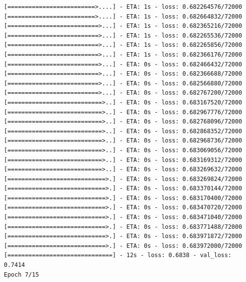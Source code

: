 \documentclass[12pt,fleqn]{article}\usepackage{../../common}
\begin{document}
\begin{verbatim}
[=========================>....] - ETA: 1s - loss: 0.682264576/72000 [=========================>....] - ETA: 1s - loss: 0.682664832/72000 [==========================>...] - ETA: 1s - loss: 0.682365216/72000 [==========================>...] - ETA: 1s - loss: 0.682265536/72000 [==========================>...] - ETA: 1s - loss: 0.682265856/72000 [==========================>...] - ETA: 1s - loss: 0.682366176/72000 [==========================>...] - ETA: 0s - loss: 0.682466432/72000 [==========================>...] - ETA: 0s - loss: 0.682366688/72000 [==========================>...] - ETA: 0s - loss: 0.682566880/72000 [==========================>...] - ETA: 0s - loss: 0.682767200/72000 [===========================>..] - ETA: 0s - loss: 0.683167520/72000 [===========================>..] - ETA: 0s - loss: 0.682967776/72000 [===========================>..] - ETA: 0s - loss: 0.682768096/72000 [===========================>..] - ETA: 0s - loss: 0.682868352/72000 [===========================>..] - ETA: 0s - loss: 0.682968736/72000 [===========================>..] - ETA: 0s - loss: 0.683069056/72000 [===========================>..] - ETA: 0s - loss: 0.683169312/72000 [===========================>..] - ETA: 0s - loss: 0.683269632/72000 [============================>.] - ETA: 0s - loss: 0.683269824/72000 [============================>.] - ETA: 0s - loss: 0.683370144/72000 [============================>.] - ETA: 0s - loss: 0.683170400/72000 [============================>.] - ETA: 0s - loss: 0.683470720/72000 [============================>.] - ETA: 0s - loss: 0.683471040/72000 [============================>.] - ETA: 0s - loss: 0.683771488/72000 [============================>.] - ETA: 0s - loss: 0.683971872/72000 [============================>.] - ETA: 0s - loss: 0.683972000/72000 [==============================] - 12s - loss: 0.6838 - val_loss: 0.7414
Epoch 7/15

\end{verbatim}
\end{document}
